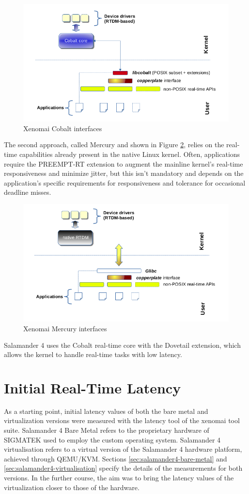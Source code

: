 \documentclass[MMR,Master,english]{twbook}
\begin{document}
\begin{figure}[H]
	\centering
	\includegraphics[width=0.6\columnwidth]{img/x3-cobalt-interfaces.png}
	\caption[Xenomai Cobalt interfaces]{Xenomai Cobalt interfaces}
	\label{fig:cobalt}
\end{figure}

\bigskip \noindent  The second approach, called Mercury and shown in Figure \ref{fig:mercury}, relies on the real-time capabilities already present in the native Linux kernel. Often, applications require the PREEMPT-RT extension to augment the mainline kernel's real-time responsiveness and minimize jitter, but this isn't mandatory and depends on the application's specific requirements for responsiveness and tolerance for occasional deadline misses. 


\begin{figure}[H]
	\centering
	\includegraphics[width=0.6\columnwidth]{img/x3-mercury-interfaces.png}
	\caption[Xenomai Mercury interfaces]{Xenomai Mercury interfaces}
	\label{fig:mercury}
\end{figure}

\noindent Salamander 4 uses the Cobalt real-time core with the Dovetail extension, which allows the kernel to handle real-time tasks with low latency.

\clearpage

\chapter{Initial Real-Time Latency}\label{cha:initial-real-time-latency}

As a starting point, initial latency values of both the bare metal and virtualization versions were measured with the latency tool of the xenomai tool suite. Salamander 4 Bare Metal refers to the proprietary hardware of SIGMATEK used to employ the custom operating system. Salamander 4 virtualisation refers to a virtual version of the Salamander 4 hardware platform, achieved through QEMU/KVM. Sections \ref{sec:salamander4-bare-metal} and \ref{sec:salamander4-virtualisation} specify the details of the measurements for both versions. In the further course, the aim was to bring the latency values of the virtualization closer to those of the hardware. 
\end{document}
